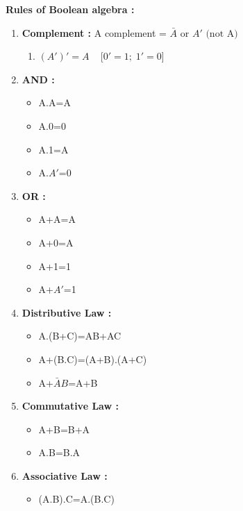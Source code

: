 \documentclass[a4aper,12pt]{report}
\newcounter{questionbox}[chapter]
\begin{document}
\begin{questionbox}
 
    
\end{questionbox}
\textbf{\large Rules of Boolean algebra : }
\begin{enumerate}
    \item \textbf{Complement : } A complement = $\bar{A} \text{ or } A' \text{ (not A)}$
    \begin{enumerate}
        \item[*] $({A'})' = A$ \,\,\, [${0'}=1;\; {1'}=0$]
    \end{enumerate}
    \item \textbf{AND : }
    \begin{itemize}
        \item A.A=A
        \item A.0=0
        \item A.1=A
        \item A.{$A'$}=0
    \end{itemize}

    \item \textbf{OR : }
    \begin{itemize}
        \item A+A=A
        \item A+0=A
        \item A+1=1
        \item A+$A'$=1
    \end{itemize}
    \item \textbf{Distributive Law : }
    \begin{itemize}
        \item A.(B+C)=AB+AC
        \item A+(B.C)=(A+B).(A+C)
        \item A+{$\bar{A}B$=A+B}
    \end{itemize}
    \item \textbf{Commutative Law : }
    \begin{itemize}
        \item A+B=B+A
        \item A.B=B.A
    \end{itemize}
    \item \textbf{Associative Law : }
    \begin{itemize}
        \item (A.B).C=A.(B.C)
    \end{itemize}
\end{enumerate}
\end{document}
